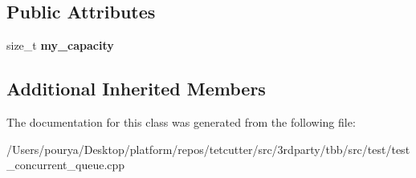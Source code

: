 \subsection*{Public Attributes}
\begin{DoxyCompactItemize}
\item 
\hypertarget{classConcQWithCapacity_ae4b3b05ad214f92a6c287598cd02b70d}{}size\+\_\+t {\bfseries my\+\_\+capacity}\label{classConcQWithCapacity_ae4b3b05ad214f92a6c287598cd02b70d}

\end{DoxyCompactItemize}
\subsection*{Additional Inherited Members}


The documentation for this class was generated from the following file\+:\begin{DoxyCompactItemize}
\item 
/\+Users/pourya/\+Desktop/platform/repos/tetcutter/src/3rdparty/tbb/src/test/test\+\_\+concurrent\+\_\+queue.\+cpp\end{DoxyCompactItemize}
